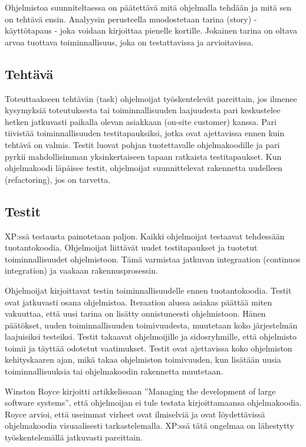 \documentclass[finnish]{tktltiki2}
\theoremstyle{definition}
\theoremstyle{remark}
\begin{document}
Ohjelmistoa suunniteltaessa on päätettävä mitä ohjelmalla tehdään ja mitä sen on tehtävä ensin. Analyysin perusteella muodostetaan tarina (story) - käyttötapaus - joka voidaan kirjoittaa pienelle kortille. Jokainen tarina on oltava arvoa tuottava toiminnallisuus, joka on testattavissa ja arvioitavissa\cite{BEC99}.

\subsection*{Tehtävä}

Toteuttaakseen tehtävän (task) ohjelmoijat työskentelevät pareittain, jos ilmenee kysymyksiä toteutuksesta tai toiminnallisuuden laajuudesta pari keskustelee hetken jatkuvasti paikalla olevan asiakkaan (on-site customer) kanssa. Pari tiivistää toiminnallisuuden testitapauksiksi, jotka ovat ajettavissa ennen kuin tehtävä on valmis. Testit luovat pohjan tuotettavalle ohjelmakoodille ja pari pyrkii mahdollisimman yksinkertaiseen tapaan ratkaista testitapaukset. Kun ohjelmakoodi läpäisee testit, ohjelmoijat suunnittelevat rakennetta uudelleen (refactoring), jos on tarvetta\cite{BEC99}.     

\subsection*{Testit}

XP:ssä testausta painotetaan paljon. Kaikki ohjelmoijat testaavat tehdessään tuotantokoodia. Ohjelmoijat liittävät uudet testitapaukset ja tuotetut toiminnallisuudet ohjelmistoon. Tämä varmistaa jatkuvan integraation (continuos integration) ja vaakaan rakennusprosessin\cite{FOW01a}.

Ohjelmoijat kirjoittavat testin toiminnallisuudelle ennen tuotantokoodia. Testit ovat jatkuvasti osana ohjelmistoa. Iteraation alussa asiakas päättää miten vakuuttaa, että uusi tarina on lisätty onnistuneesti ohjelmistoon. Hänen päätökset, uuden toiminnallisuuden toimivuudesta, muutetaan koko järjestelmän laajuisiksi testeiksi. Testit takaavat ohjelmoijille ja sidosryhmille, että ohjelmisto toimii ja täyttää odotetut vaatimukset. Testit ovat ajettavissa koko ohjelmiston kehityskaaren ajan, mikä takaa ohjelmiston toimivuuden, kun lisätään uusia toiminnallisuuksia tai ohjelmakoodin rakennetta muutetaan\cite{BEC99}.

Winston Royce kirjoitti artikkelissaan ''Managing the development of large software systems'', että ohjelmoijan ei tule testata kirjoittamaansa ohjelmakoodia. Royce arvioi, että useimmat virheet ovat ilmiselviä ja ovat löydettävissä ohjelmakoodia visuaalisesti tarkastelemalla\cite{ROY70}. XP:ssä tätä ongelmaa on lähestytty työskentelemällä jatkuvasti pareittain\cite{BEC99}. 
\end{document}
